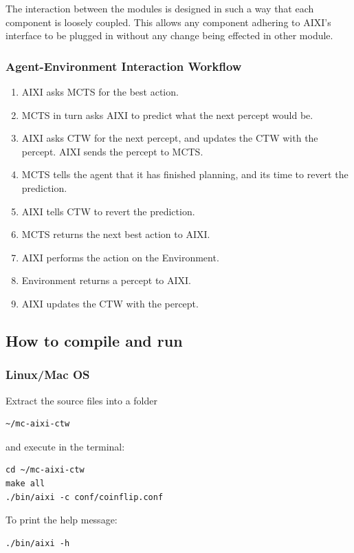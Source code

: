 \documentclass{article}
\theoremstyle{definition}
\newtheorem{primary statistics}[definition]{Primary Statistics}
\newtheorem{auxiliary statistics}[definition]{Auxiliary Statistics}
\begin{document}
The interaction between the modules is designed in such a way that each component is loosely coupled. This allows any component adhering to AIXI's interface to be plugged in without any change being effected in other module.

\subsubsection*{Agent-Environment Interaction Workflow}
\begin{enumerate}
    \item AIXI asks MCTS for the best action.
    \item MCTS in turn asks AIXI to predict what the next percept would be.
    \item AIXI asks CTW for the next percept, and updates the CTW with the percept. AIXI sends the percept to MCTS.
    \item MCTS tells the agent that it has finished planning, and its time to revert the prediction.
    \item AIXI tells CTW to revert the prediction.
    \item MCTS returns the next best action to AIXI.
    \item AIXI performs the action on the Environment.
    \item Environment returns a percept to AIXI.
    \item AIXI updates the CTW with the percept.
\end{enumerate}


\subsection{How to compile and run}
\subsubsection*{Linux/Mac OS}
Extract the source files into a folder 
\begin{lstlisting}[style=DOS]
 ~/mc-aixi-ctw
\end{lstlisting}
 and execute in the terminal:
 
\begin{lstlisting}[style=DOS]
cd ~/mc-aixi-ctw
make all
./bin/aixi -c conf/coinflip.conf
\end{lstlisting}
To print the help message:
\begin{lstlisting}[style=DOS]
./bin/aixi -h
\end{lstlisting}
\end{document}
